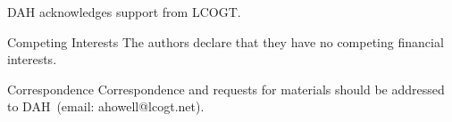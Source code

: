 \documentclass{nature1}
\begin{document}



\begin{addendum}
 \item DAH acknowledges support from LCOGT.
 \item[Competing Interests] The authors declare that they have no
competing financial interests.
 \item[Correspondence] Correspondence and requests for materials
should be addressed to DAH~(email: ahowell@lcogt.net).
\end{addendum}

\end{document}
